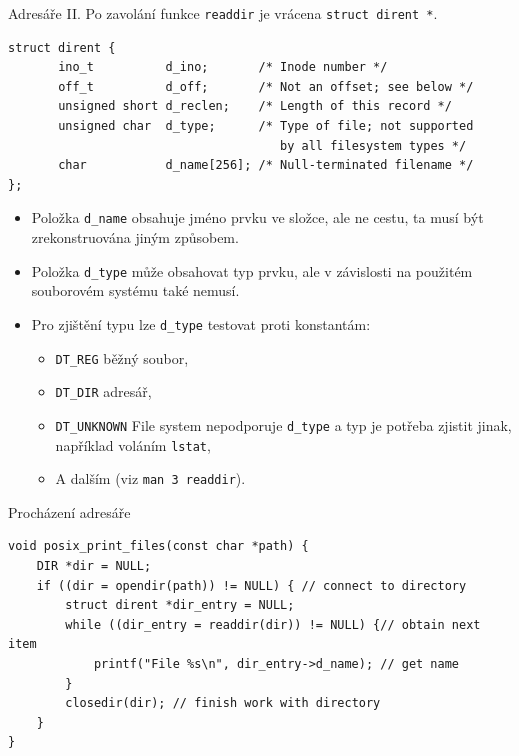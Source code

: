 \documentclass[handout]{beamer}
\begin{document}
\begin{frame}[fragile]{Adresáře II.}
    Po zavolání funkce \texttt{readdir} je vrácena \texttt{struct dirent *}.
    \begin{verbatim}
struct dirent {
       ino_t          d_ino;       /* Inode number */
       off_t          d_off;       /* Not an offset; see below */
       unsigned short d_reclen;    /* Length of this record */
       unsigned char  d_type;      /* Type of file; not supported
                                      by all filesystem types */
       char           d_name[256]; /* Null-terminated filename */
};
    \end{verbatim}
    \begin{itemize}
        \item Položka \texttt{d\_name} obsahuje jméno prvku ve složce, ale ne cestu, ta musí být zrekonstruována jiným způsobem.
        \item Položka \texttt{d\_type} může obsahovat typ prvku, ale v závislosti na použitém souborovém systému také nemusí.
        \item Pro zjištění typu lze \texttt{d\_type} testovat proti konstantám:
            \begin{itemize}
                \item \texttt{DT\_REG} běžný soubor,
                \item \texttt{DT\_DIR} adresář,
                \item \texttt{DT\_UNKNOWN} File system nepodporuje \texttt{d\_type} a typ je potřeba zjistit jinak, například voláním \texttt{lstat},
                \item A dalším (viz \texttt{man 3 readdir}).
            \end{itemize}
    \end{itemize}
\end{frame}
\begin{frame}[fragile]{Procházení adresáře}
    \begin{listing}[H]
    \begin{verbatim}
void posix_print_files(const char *path) {
    DIR *dir = NULL;
    if ((dir = opendir(path)) != NULL) { // connect to directory
        struct dirent *dir_entry = NULL;
        while ((dir_entry = readdir(dir)) != NULL) {// obtain next item
            printf("File %s\n", dir_entry->d_name); // get name
        }
        closedir(dir); // finish work with directory
    }
}
    \end{verbatim}
    \caption{Procházení FS, převzato a upraveno ze starší přednášky Šimona Totha}
\end{listing}
\end{frame}
\end{document}
